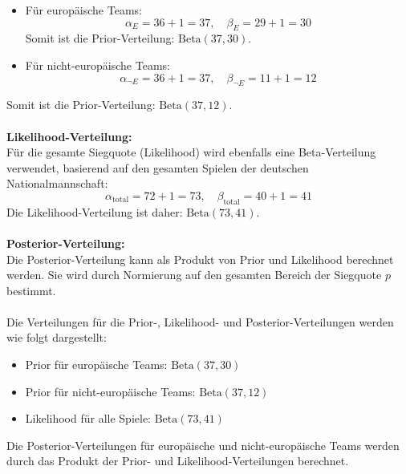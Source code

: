 \documentclass[a4paper,12pt]{article}
\begin{document}
\begin{itemize}
  \item Für europäische Teams:
    \[
    \alpha_E = 36 + 1 = 37, \quad \beta_E = 29 + 1 = 30
    \]
    Somit ist die Prior-Verteilung: \( \text{Beta}(37, 30) \).

  \item Für nicht-europäische Teams:
    \[
    \alpha_{\neg E} = 36 + 1 = 37, \quad \beta_{\neg E} = 11 + 1 = 12
    \]
\end{itemize}
Somit ist die Prior-Verteilung: \( \text{Beta}(37, 12) \).\\\\
\textbf{Likelihood-Verteilung:} \\
Für die gesamte Siegquote (Likelihood) wird ebenfalls eine Beta-Verteilung verwendet, basierend auf den gesamten Spielen der deutschen Nationalmannschaft:
\[
\alpha_{\text{total}} = 72 + 1 = 73, \quad \beta_{\text{total}} = 40 + 1 = 41
\]
Die Likelihood-Verteilung ist daher: \( \text{Beta}(73, 41) \).\\\\
\textbf{Posterior-Verteilung:} \\
Die Posterior-Verteilung kann als Produkt von Prior und Likelihood berechnet werden. Sie wird durch Normierung auf den gesamten Bereich der Siegquote \( p \) bestimmt. \\\\
Die Verteilungen für die Prior-, Likelihood- und Posterior-Verteilungen werden wie folgt dargestellt:

\begin{itemize}
  \item Prior für europäische Teams: \( \text{Beta}(37, 30) \)
  \item Prior für nicht-europäische Teams: \( \text{Beta}(37, 12) \)
  \item Likelihood für alle Spiele: \( \text{Beta}(73, 41) \)
\end{itemize}
Die Posterior-Verteilungen für europäische und nicht-europäische Teams werden durch das Produkt der Prior- und Likelihood-Verteilungen berechnet.
\end{document}
